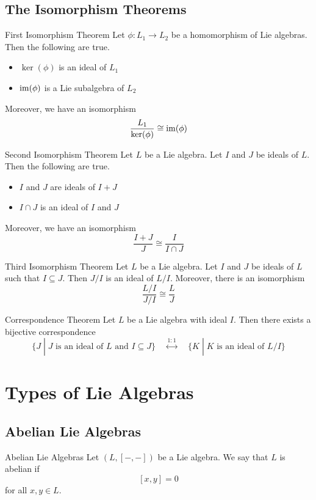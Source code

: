 \documentclass[a4paper]{article}
\begin{document}
\subsection{The Isomorphism Theorems}
\begin{thm}{First Isomorphism Theorem}{} Let $\phi:L_1\to L_2$ be a homomorphism of Lie algebras. Then the following are true. 
\begin{itemize}
\item $\ker(\phi)$ is an ideal of $L_1$
\item $\operatorname{im}(\phi)$ is a Lie subalgebra of $L_2$
\end{itemize}
Moreover, we have an isomorphism $$\frac{L_1}{\ker(\phi)}\cong\operatorname{im}(\phi)$$
\end{thm}

\begin{thm}{Second Isomorphism Theorem}{} Let $L$ be a Lie algebra. Let $I$ and $J$ be ideals of $L$. Then the following are true. 
\begin{itemize}
\item $I$ and $J$ are ideals of $I+J$
\item $I\cap J$ is an ideal of $I$ and $J$
\end{itemize}
Moreover, we have an isomorphism $$\frac{I+J}{J}\cong\frac{I}{I\cap J}$$
\end{thm}

\begin{thm}{Third Isomorphism Theorem}{} Let $L$ be a Lie algebra. Let $I$ and $J$ be ideals of $L$ such that $I\subseteq J$. Then $J/I$ is an ideal of $L/I$. Moreover, there is an isomorphism $$\frac{L/I}{J/I}\cong\frac{L}{J}$$
\end{thm}

\begin{thm}{Correspondence Theorem}{} Let $L$ be a Lie algebra with ideal $I$. Then there exists a bijective correspondence $$\{J\;|\;J\text{ is an ideal of }L\text{ and }I\subseteq J\}\;\;\;\;\overset{1:1}{\longleftrightarrow}\;\;\;\;\{K\;|\;K\text{ is an ideal of }L/I\}$$
\end{thm}

\pagebreak
\section{Types of Lie Algebras}
\subsection{Abelian Lie Algebras}
\begin{defn}{Abelian Lie Algebras}{} Let $(L,[-,-])$ be a Lie algebra. We say that $L$ is abelian if $$[x,y]=0$$ for all $x,y\in L$. 
\end{defn}
\end{document}
